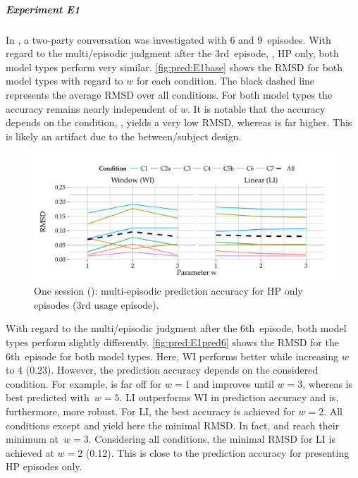 \subparagraph*{Experiment E1}
In , a two-party conversation was investigated with 6 and 9~episodes.
With regard to the multi\-/episodic judgment after the 3rd~episode, \ie, \ac{HP} only, both model types perform very similar.
\autoref{fig:pred:E1base} shows the \ac{RMSD} for both model types with regard to $\mathit{w}$ for each condition.
The black dashed line represents the average \ac{RMSD} over all conditions.
For both model types the accuracy remains nearly independent of $\mathit{w}$.
It is notable that the accuracy depends on the condition, \ie,  yields a very low \ac{RMSD}, whereas  is far higher.
This is likely an artifact due to the between\-/subject design.

\begin{figure}[t]
	\centering
\begin{knitrout}
\color{fgcolor}
\includegraphics[width=\maxwidth]{figure/plotE1BASE-1} 

\end{knitrout}
	\caption[One session (): multi-episodic prediction accuracy for the 3rd~usage episode (\acs{HP} only)]{One session (): multi-episodic prediction accuracy for \ac{HP} only episodes (3rd usage episode).}
	\label{fig:pred:E1base}
\end{figure}

With regard to the multi\-/episodic judgment after the 6th~episode, both model types perform slightly differently.
\autoref{fig:pred:E1pred6} shows the \ac{RMSD} for the 6th~episode for both model types.
Here, WI performs better while increasing $\mathit{w}$ to 4 (0.23).
However, the prediction accuracy depends on the considered condition.
For example,  is far off for $\mathit{w}=1$ and improves until $\mathit{w}=3$, whereas  is best predicted with~$\mathit{w}=5$.
LI outperforms WI in prediction accuracy and is, furthermore, more robust.
For LI, the best accuracy is achieved for $\mathit{w}=2$.
All conditions except  and  yield here the minimal \ac{RMSD}.
In fact,  and  reach their minimum at~$\mathit{w}=3$.
Considering all conditions, the minimal \ac{RMSD} for LI is achieved at $\mathit{w}=2$ (0.12).
This is close to the prediction accuracy for presenting \ac{HP} episodes only.

